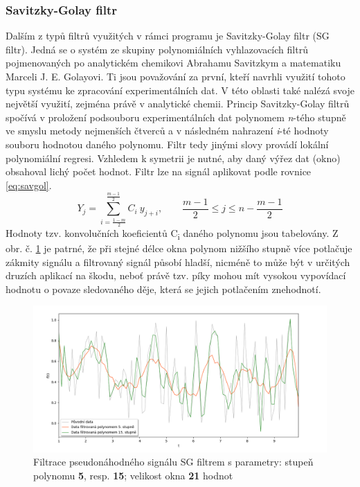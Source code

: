 \documentclass[a4paper, 12pt]{article}
\begin{document}
\subsubsection{Savitzky-Golay filtr}
\label{sec:filtr2}
\textcolor{cdorange}{Dalším z typů filtrů využitých v rámci programu je Savitzky-Golay filtr (SG filtr).} Jedná se o systém ze skupiny polynomiálních vyhlazovacích filtrů pojmenovaných po analytickém chemikovi Abrahamu Savitzkym a  matematiku Marceli J. E. Golayovi. \cite{SGF} Ti jsou považování za první, kteří navrhli využití tohoto typu systému ke zpracování experimentálních dat. V této oblasti také nalézá svoje největší využití, zejména právě v analytické chemii. Princip Savitzky-Golay filtrů spočívá v proložení podsouboru experimentálních dat polynomem \textit{n}-tého stupně ve smyslu metody nejmenších čtverců a v následném nahrazení \textit{i}-té hodnoty souboru hodnotou daného polynomu. Filtr tedy jinými slovy provádí lokální polynomiální regresi. Vzhledem k symetrii je nutné, aby daný výřez dat (okno) obsahoval lichý počet hodnot.
Filtr lze na signál aplikovat podle rovnice \ref{eq:savgol}.
\begin{equation}
     Y_{j} = \sum_{i=\frac{1-m}{2}}^{\frac{m-1}{2}} C_{i}\ y_{j+i},\qquad \frac{m-1}{2} \leq j \leq n-\frac{m-1}{2}
\label{eq:savgol}
\end{equation}
Hodnoty tzv. konvolučních koeficientů C\textsubscript{i} daného polynomu jsou tabelovány.
Z obr. č. \ref{fig:theo_savitzkygol} je patrné, že při stejné délce okna polynom nižšího stupně více potlačuje zákmity signálu a filtrovaný signál působí hladší, nicméně to může být v určitých druzích aplikací na škodu, neboť právě tzv. píky mohou mít vysokou vypovídací hodnotu o povaze sledovaného děje, která se jejich potlačením znehodnotí.

\begin{figure}[hbt!]
 \includegraphics[width=\linewidth]{savgol_.png}
 \caption{Filtrace pseudonáhodného signálu SG filtrem s parametry: stupeň polynomu \textbf{5}, resp. \textbf{15}; velikost okna \textbf{21} hodnot}
 \centering
 \label{fig:theo_savitzkygol}
\end{figure}
\end{document}
